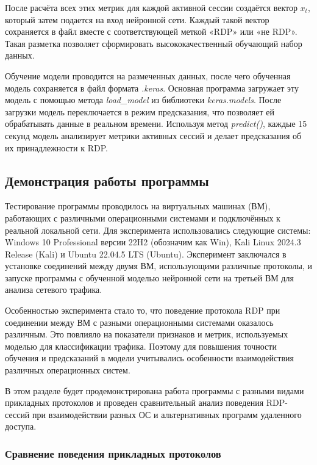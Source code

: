\documentclass[spec, och, diploma]{SCWorks}
\begin{document}
После расчёта всех этих метрик для каждой активной сессии создаётся вектор $x_t$, который затем подается на вход нейронной сети. 
Каждый такой вектор сохраняется в файл вместе с соответствующей меткой «RDP» или «не RDP». Такая разметка позволяет сформировать 
высококачественный обучающий набор данных.

Обучение модели проводится на размеченных данных, после чего обученная модель сохраняется в файл формата \textit{.keras}. Основная программа 
загружает эту модель с помощью метода \textit{load_model} из библиотеки \textit{keras.models}. После загрузки модель переключается в 
режим предсказания, что позволяет ей обрабатывать данные в реальном времени. Используя метод \textit{predict()}, каждые 15 секунд модель 
анализирует метрики активных сессий и делает предсказания об их принадлежности к RDP.  

\subsection{Демонстрация работы программы}

Тестирование программы проводилось на виртуальных машинах (ВМ), работающих с различными операционными системами и подключённых к реальной локальной сети. 
Для эксперимента использовались следующие системы: Windows 10 Professional версии 22H2 (обозначим как Win), Kali Linux 2024.3 Release (Kali) и 
Ubuntu 22.04.5 LTS (Ubuntu). Эксперимент заключался в установке соединений между двумя ВМ, использующими различные протоколы, и запуске программы 
с обученной моделью нейронной сети на третьей ВМ для анализа сетевого трафика.

Особенностью эксперимента стало то, что поведение протокола RDP при соединении между ВМ с разными операционными системами оказалось различным. Это 
повлияло на показатели признаков и метрик, используемых моделью для классификации трафика. Поэтому для повышения точности обучения и предсказаний в 
модели учитывались особенности взаимодействия различных операционных систем.

В этом разделе будет продемонстрирована работа программы с разными видами прикладных протоколов и проведен сравнительный анализ поведения RDP-сессий 
при взаимодействии разных ОС и альтернативных программ удаленного доступа.

\subsubsection{Сравнение поведения прикладных протоколов}
\end{document}
